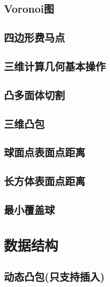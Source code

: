 \documentclass[10pt]{article}
\begin{document}
	\subsection{Voronoi图}
		

	\subsection{四边形费马点}
		

	\subsection{三维计算几何基本操作}
		

	\subsection{凸多面体切割}
		

	\subsection{三维凸包}
		

	\subsection{球面点表面点距离}
		
		
	\subsection{长方体表面点距离}
		

	\subsection{最小覆盖球}
		

\section{数据结构}
	\subsection{动态凸包(只支持插入)}
		
		
\end{document}
